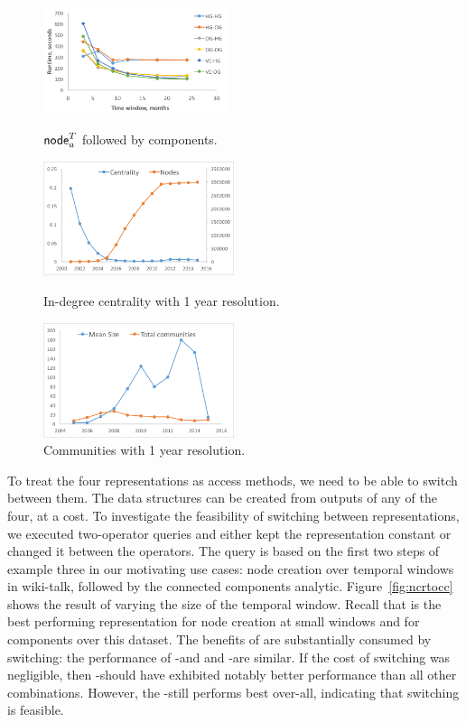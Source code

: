 \begin{figure}[t]
\centering
\begin{minipage}{2.2in}
\centering
\includegraphics[width=2.1in]{figs/switch_cc.png}
\caption{$\textsf{node}^T_a$ followed by components.}
\label{fig:ncrtocc}
\vspace{-0.1in}
\end{minipage}
\begin{minipage}{2.2in}
\includegraphics[width=2.2in]{figs/centrality.png}
\caption{In-degree centrality with 1 year resolution.}
\label{fig:central}
\end{minipage}
\begin{minipage}{2.2in}
\includegraphics[width=2.2in]{figs/communities.png}
\caption{Communities with 1 year resolution.}
\label{fig:commun}
\end{minipage}
\end{figure}

To treat the four representations as access methods, we need to be
able to switch between them.  The data structures can be created from
outputs of any of the four, at a cost.  To investigate the feasibility
of switching between representations, we executed two-operator queries
and either kept the representation constant or changed it between the
operators.  The query is based on the first two steps of example three
in our motivating use cases: node creation over temporal windows in
wiki-talk, followed by the connected components analytic.
Figure~\ref{fig:ncrtocc} shows the result of varying the size of the
temporal window.  Recall that \og is the best performing
representation for node creation at small windows and \hg for
components over this dataset.  The benefits of \hg are substantially
consumed by switching: the performance of \og-\og and and \og-\hg are
similar.  If the cost of switching was negligible, then \og-\hg should
have exhibited notably better performance than all other combinations.
However, the \og-\hg still performs best over-all, indicating that
switching is feasible.


